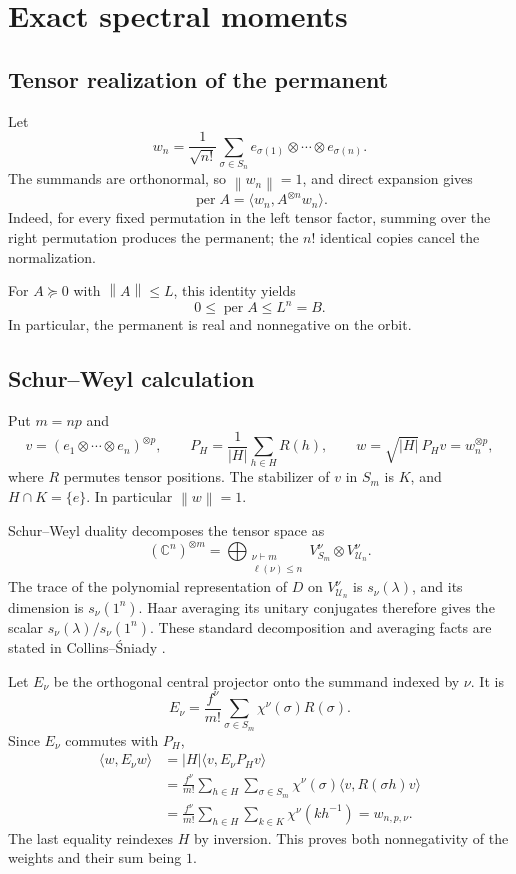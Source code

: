 \documentclass[11pt]{article}
\newcommand{\per}{\operatorname{per}}
\newcommand{\U}{\mathcal U}
\newcommand{\C}{\mathbb C}
\newcommand{\norm}[1]{\left\lVert#1\right\rVert}
\newcommand{\ip}[2]{\langle #1,#2\rangle}
\theoremstyle{definition}\newtheorem{definition}[theorem]{Definition}
\theoremstyle{remark}\newtheorem{remark}[theorem]{Remark}
\begin{document}
\section{Exact spectral moments}\label{sec:moments}
\subsection{Tensor realization of the permanent}
Let
\[
 w_n=\frac1{\sqrt{n!}}\sum_{\sigma\in S_n}
 e_{\sigma(1)}\otimes\cdots\otimes e_{\sigma(n)}.
\]
The summands are orthonormal, so $\norm{w_n}=1$, and direct expansion gives
\begin{equation}\label{eq:tensor}
 \per A=\ip{w_n}{A^{\otimes n}w_n}.
\end{equation}
Indeed, for every fixed permutation in the left tensor factor, summing over the right permutation produces the permanent; the $n!$ identical copies cancel the normalization.

For $A\succeq0$ with $\norm A\leq L$, this identity yields
\begin{equation}\label{eq:bound}
 0\leq\per A\leq L^n=B.
\end{equation}
In particular, the permanent is real and nonnegative on the orbit.

\subsection{Schur--Weyl calculation}
Put $m=np$ and
\[
 v=(e_1\otimes\cdots\otimes e_n)^{\otimes p},\qquad
 P_H=\frac1{|H|}\sum_{h\in H}R(h),\qquad
 w=\sqrt{|H|}\,P_Hv=w_n^{\otimes p},
\]
where $R$ permutes tensor positions. The stabilizer of $v$ in $S_m$ is $K$, and $H\cap K=\{e\}$. In particular $\norm w=1$.

Schur--Weyl duality decomposes the tensor space as
\[
 (\C^n)^{\otimes m}
 =\bigoplus_{\substack{\nu\vdash m\\\ell(\nu)\leq n}}
 V^\nu_{S_m}\otimes V^\nu_{\U_n}.
\]
The trace of the polynomial representation of $D$ on $V^\nu_{\U_n}$ is $s_\nu(\lambda)$, and its dimension is $s_\nu(1^n)$. Haar averaging its unitary conjugates therefore gives the scalar $s_\nu(\lambda)/s_\nu(1^n)$. These standard decomposition and averaging facts are stated in Collins--\'{S}niady \cite{collins}.

Let $E_\nu$ be the orthogonal central projector onto the summand indexed by $\nu$. It is
\[
 E_\nu=\frac{f^\nu}{m!}\sum_{\sigma\in S_m}\chi^\nu(\sigma)R(\sigma).
\]
Since $E_\nu$ commutes with $P_H$,
\begin{align*}
 \ip{w}{E_\nu w}
 &=|H|\ip{v}{E_\nu P_Hv}\\
 &=\frac{f^\nu}{m!}\sum_{h\in H}\sum_{\sigma\in S_m}
       \chi^\nu(\sigma)\ip{v}{R(\sigma h)v}\\
 &=\frac{f^\nu}{m!}\sum_{h\in H}\sum_{k\in K}\chi^\nu(kh^{-1})
 =w_{n,p,\nu}.
\end{align*}
The last equality reindexes $H$ by inversion. This proves both nonnegativity of the weights and their sum being $1$.
\end{document}
